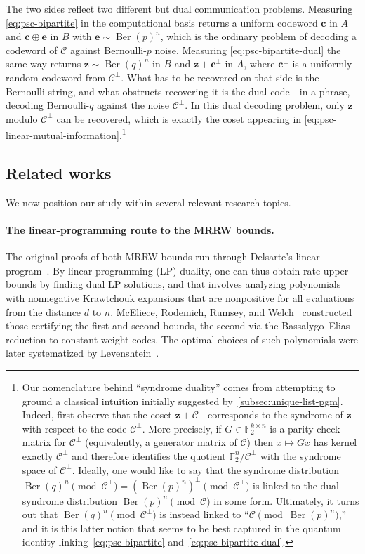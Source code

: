 \documentclass[11pt]{article}
\theoremstyle{remark}
\newcommand{\cC}{\mathcal{C}}
\newcommand{\F}{\mathbb{F}}
\newcommand{\Ber}{\operatorname{Ber}}
\newcommand{\bc}{\mathbf{c}}
\newcommand{\be}{\mathbf{e}}
\newcommand{\bz}{\mathbf{z}}
\begin{document}
The two sides reflect two different but dual communication problems. Measuring \eqref{eq:psc-bipartite} in the computational basis returns a uniform codeword $\bc$ in $A$ and $\bc \oplus \be$ in $B$ with $\be \sim \Ber(p)^n$, which is the ordinary problem of decoding a codeword of $\cC$ against Bernoulli-$p$ noise. Measuring \eqref{eq:psc-bipartite-dual} the same way returns $\bz \sim \Ber(q)^n$ in $B$ and $\bz+\bc^\perp$ in $A$, where $\bc^\perp$ is a uniformly random codeword from $\cC^\perp$. What has to be recovered on that side is the Bernoulli string, and what obstructs recovering it is the dual code---in a phrase, decoding Bernoulli-$q$ against the noise $\cC^\perp$. In this dual decoding problem, only $\bz$ modulo $\cC^\perp$ can be recovered, which is exactly the coset appearing in \eqref{eq:psc-linear-mutual-information}.\footnote{Our nomenclature behind ``syndrome duality'' comes from attempting to ground a classical intuition initially suggested by~\cref{subsec:unique-list-pgm}. Indeed, first observe that the coset $\bz+\cC^\perp$ corresponds to the syndrome of $\bz$ with respect to the code $\cC^\perp$. More precisely, if $G \in \F_2^{k \times n}$ is a parity-check matrix for $\cC^\perp$ (equivalently, a generator matrix of $\cC$) then $x \mapsto Gx$ has kernel exactly $\cC^\perp$ and therefore identifies the quotient $\F_2^n/\cC^\perp$ with the syndrome space of $\cC^\perp$. Ideally, one would like to say that the syndrome distribution $\Ber(q)^n \pmod{\cC^\perp} = (\Ber(p)^n)^{\perp} \pmod{\cC^\perp}$ is linked to the dual syndrome distribution $\Ber(p)^n \pmod{\cC}$ in some form. Ultimately, it turns out that $\Ber(q)^n \pmod{\cC^\perp}$ is instead linked to ``$\cC \pmod{\Ber(p)^n}$,'' and it is this latter notion that seems to be best captured in the quantum identity linking~\eqref{eq:psc-bipartite} and~\eqref{eq:psc-bipartite-dual}.}

\subsection{Related works}
\label{subsec:related-works}

We now position our study within several relevant research topics.

\paragraph{The linear-programming route to the MRRW bounds.} The original proofs of both MRRW bounds run through Delsarte's linear program~\cite{Del72,Del73}. By linear programming (LP) duality, one can thus obtain rate upper bounds by finding dual LP solutions, and that involves analyzing polynomials with nonnegative Krawtchouk expansions that are nonpositive for all evaluations from the distance $d$ to $n$. McEliece, Rodemich, Rumsey, and Welch~\cite{MRRW77} constructed those certifying the first and second bounds, the second via the Bassalygo--Elias reduction to constant-weight codes. The optimal choices of such polynomials were later systematized by Levenshtein~\cite{Lev95}. 
\end{document}
